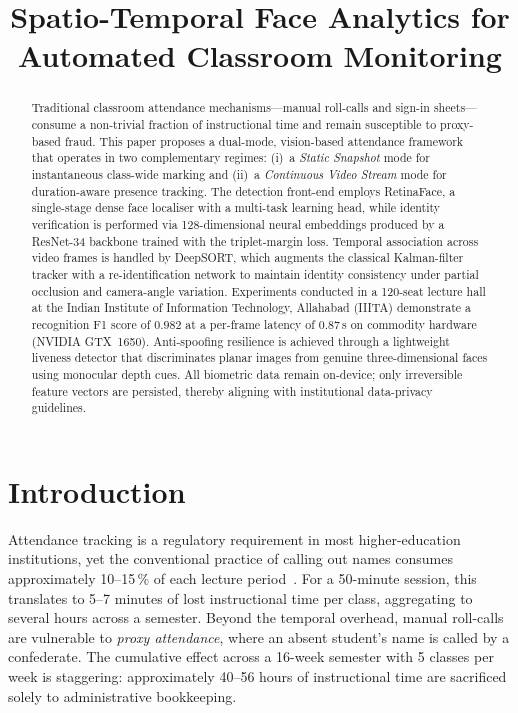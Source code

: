 \documentclass[conference, 10pt]{IEEEtran}
\title{Spatio-Temporal Face Analytics for Automated Classroom Monitoring}
\author{
    \IEEEauthorblockN{Yash Gupta}
    \IEEEauthorblockA{
        Department of Information Technology\\
        Indian Institute of Information Technology, Allahabad (IIITA)\\
        Prayagraj, India\\
        Email: yash.gupta@iiita.ac.in
    }
}
\begin{document}
\maketitle


\begin{abstract}
Traditional classroom attendance mechanisms---manual roll-calls and sign-in sheets---consume a
non-trivial fraction of instructional time and remain susceptible to proxy-based fraud.  This
paper proposes a dual-mode, vision-based attendance framework that operates in two complementary
regimes: (i)~a \emph{Static Snapshot} mode for instantaneous class-wide marking and (ii)~a
\emph{Continuous Video Stream} mode for duration-aware presence tracking.  The detection
front-end employs RetinaFace, a single-stage dense face localiser with a multi-task learning
head, while identity verification is performed via 128-dimensional neural embeddings produced
by a ResNet-34 backbone trained with the triplet-margin loss.  Temporal association across video
frames is handled by DeepSORT, which augments the classical Kalman-filter tracker with a
re-identification network to maintain identity consistency under partial occlusion and
camera-angle variation.  Experiments conducted in a 120-seat lecture hall at the Indian Institute
of Information Technology, Allahabad (IIITA) demonstrate a recognition F1 score of
$0.982$ at a per-frame latency of $0.87$\,s on commodity hardware (NVIDIA GTX~1650).
Anti-spoofing resilience is achieved through a lightweight liveness detector that
discriminates planar images from genuine three-dimensional faces using monocular depth cues.
All biometric data remain on-device; only irreversible feature vectors are persisted, thereby
aligning with institutional data-privacy guidelines.
\end{abstract}

\section{Introduction}
\label{sec:intro}

Attendance tracking is a regulatory requirement in most higher-education institutions, yet the
conventional practice of calling out names consumes approximately 10--15\,\% of each lecture
period~\cite{ref_smart_attend}.  For a 50-minute session, this translates to 5--7 minutes of
lost instructional time per class, aggregating to several hours across a semester.  Beyond the
temporal overhead, manual roll-calls are vulnerable to \emph{proxy attendance}, where an absent
student's name is called by a confederate.  The cumulative effect across a 16-week semester
with 5 classes per week is staggering: approximately 40--56 hours of instructional time are
sacrificed solely to administrative bookkeeping.
\end{document}
